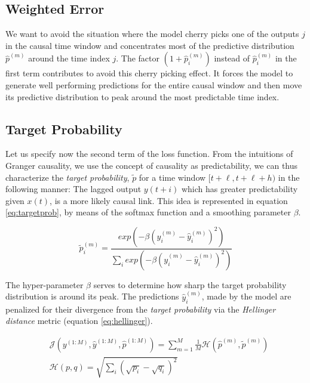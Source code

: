 \documentclass[twoside]{article}
\begin{document}
\subsection{Weighted Error}

We want to avoid the situation where the model cherry picks one of the outputs $j$ in the causal time window and concentrates most of the predictive distribution $\hat p^{(m)}$ around the time index $j$. 
The factor $(1+\hat p_i^{(m)})$ instead of $\hat p_i^{(m)}$ in the first term contributes 
to avoid this cherry picking effect. It forces the model to generate well performing
predictions for the entire causal window and then move its predictive distribution
to peak around the most predictable time index.

\subsection{Target Probability}

Let us specify now the second term of the loss function.
From the intuitions of Granger causality, we use the concept of causality as predictability, we can thus characterize the \emph{target probability}, $\widetilde{p}$ for a time window $[t+\ell, t+\ell+h)$ in the following manner: The lagged output $y(t+i)$ which has greater predictability given $x(t)$, is a more likely causal link. This idea is represented in equation \ref{eq:targetprob}, by means of the softmax function and a smoothing parameter $\beta$.

\begin{equation}\label{eq:targetprob}
\widetilde{p}_{i}^{(m)} = \frac{exp \left(- \beta (y_{i}^{(m)} - \hat{y}_{i}^{(m)})^{2} \right)}{\sum_{i}{exp \left(- \beta (y_{i}^{(m)} - \hat{y}_{i}^{(m)})^{2} \right)}} 
\end{equation}

The hyper-parameter $\beta$ serves to determine how sharp the target probability distribution is around its peak. The predictions $\hat{y}^{(m)}_{i}$, made by the model are penalized for their divergence from the \emph{target probability} via the \emph{Hellinger distance} metric (equation \ref{eq:hellinger}).

\begin{align}\label{eq:prior}
& \mathcal{J}(y^{(1:M)}, \hat{y}^{(1:M)}, \hat{p}^{(1:M)}) = \sum_{m = 1}^{M}{\frac{1}{M} \mathcal{H}(\hat{p}^{(m)}, \widetilde{p}^{(m)})} \\
& \mathcal{H}(p, q) = \sqrt{\sum_{i}{(\sqrt{p_i} -  \sqrt{q_i})^2}} \label{eq:hellinger}
\end{align}
\end{document}
